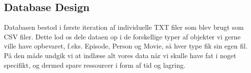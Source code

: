 \subsection{Database Design}
Databasen bestod i første iteration af individuelle TXT filer som blev brugt som CSV filer. Dette lod os dele dataen op i de forskellige typer af objekter vi gerne ville have opbevaret, f.eks. Episode, Person og Movie, så hver type fik sin egen fil. På den måde undgik vi at indlæse alt vores data når vi skulle have fat i noget specifikt, og dermed spare ressourcer i form af tid og lagring.

